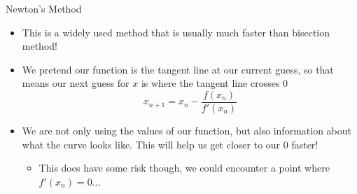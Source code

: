 {}\documentclass[letterpaper,
compress,
xcolor=x11names,
]{beamer}
\begin{document}
\begin{frame}{Newton's Method}
	\footnotesize
	\begin{itemize}
		\item This is a widely used method that is usually much faster than bisection method!
		\item<2-> We pretend our function is the tangent line at our current guess, so that means our next guess for $x$ is where the tangent line crosses 0
		\begin{equation*}
			x_{n+1} = x_n - \frac{f(x_n)}{f'(x_n)}
		\end{equation*}
		\begin{center}
		\end{center}
		\item<3-> We are not only using the values of our function, but also information about what the curve looks like. This will help us get closer to our 0 faster!
		\begin{itemize}
			\item This does have some risk though, we could encounter a point where $f'(x_n) = 0$...
		\end{itemize}
	\end{itemize}
\end{frame}

\end{document}
